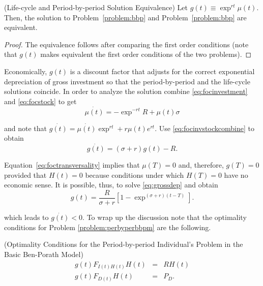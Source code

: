 \begin{claim} (Life-cycle and Period-by-period Solution Equivalence) 
Let $g(t) \equiv \exp^{rt} \mu(t)$. Then, the solution to Problem~\ref{problem:bbp} and Problem~\ref{problem:bbp} are equivalent.
\end{claim}

\begin{proof}
The equivalence follows after comparing the first order conditions (note that $g(t)$ makes equivalent the first order conditions of the two problems).
\end{proof}

\indent Economically, $g(t)$ is a discount factor that adjusts for the correct exponential depreciation of gross investment so that the period-by-period and the life-cycle solutions coincide. In order to analyze the solution combine \eqref{eq:focinvestment} and \eqref{eq:focstock} to get 
\begin{equation}
\dot{\mu(t)} = - \exp^{-rt} R + \mu(t) \sigma \label{eq:focinvstockcombine}
\end{equation}

\noindent and note that $\dot{g(t)} = \dot{\mu(t)} \exp^{rt} + r \mu(t) e ^{rt}$. Use \eqref{eq:focinvstockcombine} to obtain 
\begin{equation}
\dot{g(t)} = (\sigma + r ) g(t) - R. \label{eq:grossdep}
\end{equation}

\indent Equation~\eqref{eq:foctransversality} implies that $\mu(T) = 0 $ and, therefore, $g(T) = 0$ provided that $H(t) = 0$ because conditions under which $H(T) = 0$ have no economic sense. It is possible, thus, to solve \eqref{eq:grossdep} and obtain
\begin{equation}
g(t) = \frac{R}{\sigma + r} \left[ 1 - \exp^{(\sigma + r)(t - T)} \right].
\end{equation}

\noindent which leads to $\dot{g(t)} < 0$. To wrap up the discussion note that the optimality conditions for Problem \ref{problem:perbyperbbpm} are the following.\\
 
\begin{condition} (Optimality Conditions for the Period-by-period Individual's Problem in the Basic Ben-Porath Model)
\begin{eqnarray}
g(t) F_{I(t)H(t)} H(t) &=& R H (t) \nonumber \\
g(t) F_{D(t)} H(t) &=& P_{D} \label{eq:newfocs}. 
\end{eqnarray}
\end{condition}

